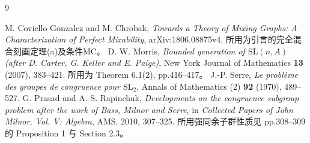\begin{thebibliography}{9}
 M. Coviello Gonzalez and M. Chrobak,
\emph{Towards a Theory of Mixing Graphs: A Characterization of Perfect Mixability},
arXiv:1806.08875v4. 所用为引言的完全混合刻画定理(a)及条件MC。
 D. W. Morris,
\emph{Bounded generation of $\mathrm{SL}(n,A)$ (after D. Carter, G. Keller and E. Paige)},
New York Journal of Mathematics \textbf{13} (2007), 383--421.
所用为 Theorem 6.1(2), pp.416--417。
 J.-P. Serre,
\emph{Le probl\`eme des groupes de congruence pour $\mathrm{SL}_2$},
Annals of Mathematics (2) \textbf{92} (1970), 489--527.
 G. Prasad and A. S. Rapinchuk,
\emph{Developments on the congruence subgroup problem after the work of Bass, Milnor and Serre},
in \emph{Collected Papers of John Milnor, Vol. V: Algebra}, AMS, 2010, 307--325.
所用强同余子群性质见 pp.308--309 的 Proposition 1 与 Section 2.3。
\end{thebibliography}


